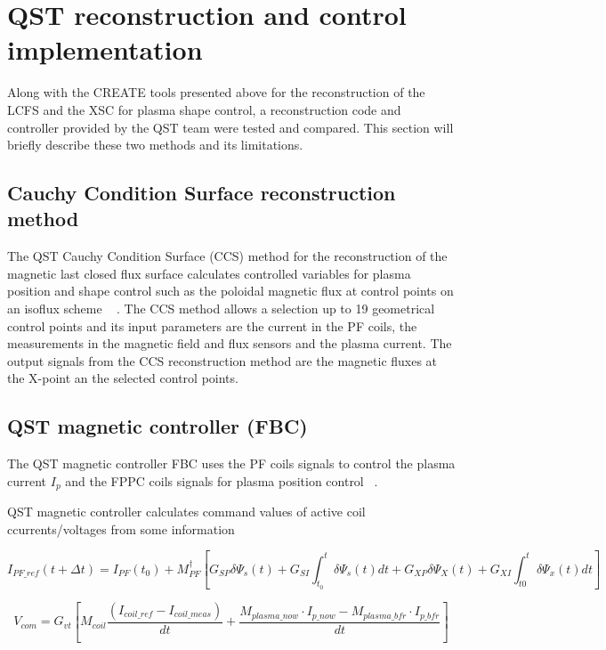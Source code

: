 \section{QST reconstruction and control implementation}

Along with the CREATE tools presented above  for the reconstruction of the LCFS and the XSC for plasma shape control, a reconstruction code and controller provided by the QST team were tested and compared. This section will briefly describe these two methods and its limitations.  

\subsection{Cauchy Condition Surface reconstruction  method }
The QST Cauchy Condition Surface (CCS) method for the reconstruction of the magnetic last closed flux surface calculates controlled variables for plasma position and shape control such as the poloidal magnetic flux at control points on an isoflux scheme  ~\cite{CCS} . The CCS method allows a selection up to 19 geometrical control points and its input parameters are the current in the PF coils, the measurements in the magnetic field and flux sensors and the plasma current. The output signals from the CCS reconstruction method are the magnetic fluxes at the X-point an the selected control points. 

\subsection{QST magnetic controller (FBC)}


The QST magnetic controller FBC uses the PF coils signals to control the plasma current $I_p$ and the FPPC coils signals for plasma position control ~\cite{FBC}.

QST magnetic controller calculates command values of active coil ccurrents/voltages from some information

\begin{equation}
I_{PF\_ref}(t+\Delta t) = I_{PF}(t_0)+M^\dagger_{PF}\left[G_{SP}\delta\Psi_s(t)+G_{SI}\int_{t_0}^{t}\delta\Psi_s(t)dt+G_{XP}\delta\Psi_X(t)+G_{XI}\int_{t0}^{t}\delta\Psi_x(t)dt\right]
\end{equation}

\begin{equation}
V_{com}=G_{vt}\left[M_{coil}\frac{(I_{coil\_ref}-I_{coil\_meas})}{dt}+ \frac{M_{plasma\_now} \cdot I_{p\_now} - M_{plasma\_ bfr} \cdot I_{p\_bfr}}{dt}\right]
\end{equation}

